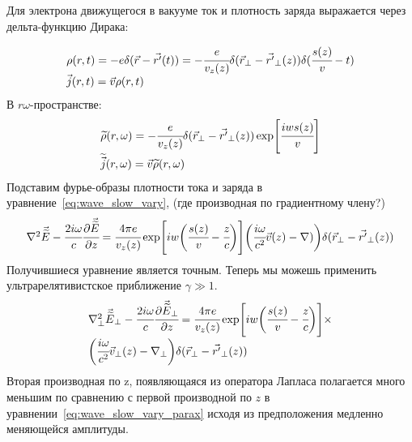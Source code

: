 \documentclass[14pt,a4paper]{extarticle}
\numberwithin{equation}{section}
\begin{document}
Для электрона движущегося в вакууме ток и плотность заряда выражается через дельта-функцию Дирака:

\begin{equation}
	\begin{array}{lcl}
		\rho(r,t) = -e\delta(\vec{r}- \vec{r'}(t)) = -\cfrac{e}{v_z(z)}\delta(\vec{r}_{\bot}- \vec{r'}_{\bot}(z))\delta(\cfrac{s(z)}{v} - t)\\
		\vec{j}(r,t) = \vec{v}\rho(r,t)	
	\end{array}
\end{equation} 
В $r\omega$-пространстве: 
\begin{equation}
	\begin{array}{lcl}
		\widetilde{\rho}(r,\omega) = -\cfrac{e}{v_z(z)}\delta(\vec{r}_{\bot}- \vec{r'}_{\bot}(z))\exp[\cfrac{iws(z)}{v}]\\
		\widetilde{\vec{j}}(r,\omega) = \vec{v}\widetilde{\rho}(r,\omega)	
	\end{array}
\end{equation} 
Подставим фурье-образы плотности тока и заряда в уравнение~\ref{eq:wave_slow_vary}, (где производная по градиентному члену?)
\begin{equation}
	\label{eq:wave_eq}
	\begin{array}{lcl}
		\nabla^2 \vec{\widetilde{E}} - \cfrac{2i\omega}{c}\cfrac{\partial\vec{\widetilde{E}}}{\partial z} = 
		\cfrac{4\pi e}{v_z(z)} \exp[iw\bigg(\cfrac{s(z)}{v} - \cfrac{z}{c}\bigg)]
		\bigg(  
			\cfrac{i\omega}{c^2}\vec{v}(z)
			-\nabla)\bigg) \delta(\vec{r}_{\bot} - \vec{r'}_{\bot}(z)) 
		
	\end{array}
\end{equation} 
Получившиеся уравнение является точным. Теперь мы можешь применить ультрарелятивистское приближение $\gamma \gg 1$. 
\begin{equation}
	\label{eq:wave_slow_vary_parax}
	\begin{array}{lcl}
		\nabla_{\bot}^2 \vec{\widetilde{E}}_{\bot} - \cfrac{2i\omega}{c}\cfrac{\partial\vec{\widetilde{E}}_{\bot}}{\partial z} = 
		\cfrac{4\pi e}{v_z(z)} \exp[iw\bigg(\cfrac{s(z)}{v} - \cfrac{z}{c}\bigg)]\times\\
		\bigg(  
			\cfrac{i\omega}{c^2}\vec{v}_{\bot}(z) 
			-\nabla_{\bot}\bigg) \delta(\vec{r}_{\bot} - \vec{r'}_{\bot}(z)) 
	\end{array}
\end{equation} 
Вторая производная по z, появляющаяся из оператора Лапласа полагается много меньшим по сравнению с первой производной по $z$ в уравнении~\ref{eq:wave_slow_vary_parax} исходя из предположения медленно меняющейся амплитуды.
\end{document}
